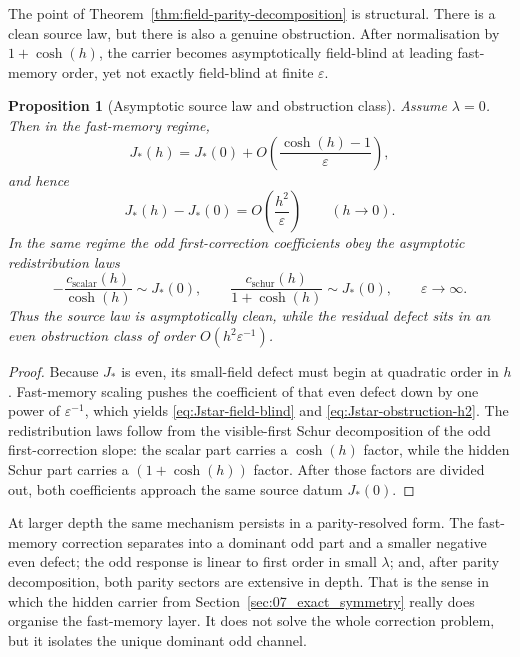 \documentclass[11pt]{article}
\numberwithin{equation}{section}
\newcommand{\eps}{\varepsilon}
\theoremstyle{thmcompact}
\newtheorem{proposition}[theorem]{Proposition}
\theoremstyle{remark}
\begin{document}
The point of Theorem~\ref{thm:field-parity-decomposition} is structural. There is a clean source law, but there is also a genuine obstruction. After normalisation by $1+\cosh(h)$, the carrier becomes asymptotically field-blind at leading fast-memory order, yet not exactly field-blind at finite $\eps$.

\begin{proposition}[Asymptotic source law and obstruction class]\label{prop:source-law-obstruction}
Assume $\lambda=0$. Then in the fast-memory regime,
\begin{equation}\label{eq:Jstar-field-blind}
J_*(h)=J_*(0)+O\!\left(\frac{\cosh(h)-1}{\eps}\right),
\end{equation}
and hence
\begin{equation}\label{eq:Jstar-obstruction-h2}
J_*(h)-J_*(0)=O\!\left(\frac{h^2}{\eps}\right)
\qquad (h\to 0).
\end{equation}
In the same regime the odd first-correction coefficients obey the asymptotic redistribution laws
\begin{equation}\label{eq:odd-redistribution-scalar}
-\frac{c_{\mathrm{scalar}}(h)}{\cosh(h)}\sim J_*(0),
\qquad
\frac{c_{\mathrm{schur}}(h)}{1+\cosh(h)}\sim J_*(0),
\qquad \eps\to\infty.
\end{equation}
Thus the source law is asymptotically clean, while the residual defect sits in an even obstruction class of order $O(h^2\eps^{-1})$.
\end{proposition}

\begin{proof}
Because $J_*$ is even, its small-field defect must begin at quadratic order in $h$. Fast-memory scaling pushes the coefficient of that even defect down by one power of $\eps^{-1}$, which yields \eqref{eq:Jstar-field-blind} and \eqref{eq:Jstar-obstruction-h2}. The redistribution laws follow from the visible-first Schur decomposition of the odd first-correction slope: the scalar part carries a $\cosh(h)$ factor, while the hidden Schur part carries a $(1+\cosh(h))$ factor. After those factors are divided out, both coefficients approach the same source datum $J_*(0)$.
\end{proof}

At larger depth the same mechanism persists in a parity-resolved form. The fast-memory correction separates into a dominant odd part and a smaller negative even defect; the odd response is linear to first order in small $\lambda$; and, after parity decomposition, both parity sectors are extensive in depth. That is the sense in which the hidden carrier from Section~\ref{sec:07_exact_symmetry} really does organise the fast-memory layer. It does not solve the whole correction problem, but it isolates the unique dominant odd channel.
\end{document}
